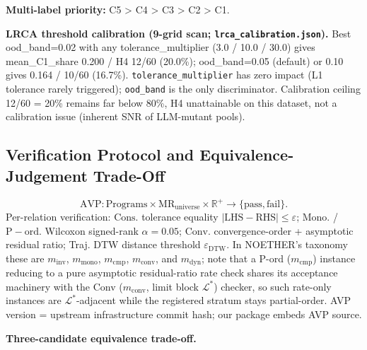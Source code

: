 \documentclass[manuscript,screen,review]{acmart}
\begin{document}
\textbf{Multi-label priority:} C5 \textgreater{} C4 \textgreater{} C3
\textgreater{} C2 \textgreater{} C1.

\textbf{LRCA threshold calibration (9-grid scan;
\texttt{lrca\_calibration.json}).} Best ood\_band=0.02 with any
tolerance\_multiplier (3.0 / 10.0 / 30.0) gives mean\_C1\_share 0.200 /
H4 12/60 (20.0\%); ood\_band=0.05 (default) or 0.10 gives 0.164 / 10/60
(16.7\%). \texttt{tolerance\_multiplier} has zero impact (L1 tolerance
rarely triggered); \texttt{ood\_band} is the only discriminator.
Calibration ceiling 12/60 = 20\% remains far below 80\%, H4
unattainable on this dataset, not a calibration issue (inherent SNR of
LLM-mutant pools).

\subsection{Verification Protocol and Equivalence-Judgement Trade-Off}\label{a.3-avp-protocol-specification-and-equivalence-judgement-trade-off}

\[
\mathrm{AVP}: \mathrm{Programs} \times \mathrm{MR}_{\mathrm{universe}} \times \mathbb{R}^{+} \to \{\mathrm{pass}, \mathrm{fail}\}.
\]
Per-relation verification: $\mathrm{Cons.}$ tolerance equality $|\mathrm{LHS} -
\mathrm{RHS}| \leq \varepsilon$; $\mathrm{Mono.}$ / $\mathrm{P-ord.}$ Wilcoxon signed-rank $\alpha=0.05$; $\mathrm{Conv.}$
convergence-order + asymptotic residual ratio; Traj. DTW distance
threshold $\varepsilon_{\mathrm{DTW}}$. In NOETHER's taxonomy
\citep{noether2026} these are $m_{\mathrm{inv}}$, $m_{\mathrm{mono}}$,
$m_{\mathrm{cmp}}$, $m_{\mathrm{conv}}$, and $m_{\mathrm{dyn}}$; note that a
P-ord ($m_{\mathrm{cmp}}$) instance reducing to a pure asymptotic
residual-ratio rate check shares its acceptance machinery with the Conv
($m_{\mathrm{conv}}$, limit block $\mathcal{L}^{*}$) checker, so such
rate-only instances are $\mathcal{L}^{*}$-adjacent while the registered
stratum stays partial-order. AVP version = upstream infrastructure commit
hash; our package embeds AVP source.

\textbf{Three-candidate equivalence trade-off.}
\end{document}
